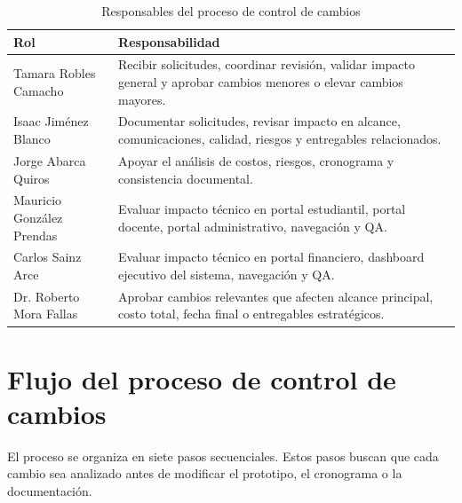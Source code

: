 \documentclass[11pt,spanish]{article}
\begin{document}
\begin{table}[H]
\centering
\caption{Responsables del proceso de control de cambios}
\label{tab:responsables-cambios}
{\small
\begin{tabularx}{\textwidth}{p{4cm} Y}
\toprule
\textbf{Rol} & \textbf{Responsabilidad} \\
\midrule
Tamara Robles Camacho & Recibir solicitudes, coordinar revisión, validar impacto general y aprobar cambios menores o elevar cambios mayores. \\
Isaac Jiménez Blanco & Documentar solicitudes, revisar impacto en alcance, comunicaciones, calidad, riesgos y entregables relacionados. \\
Jorge Abarca Quiros & Apoyar el análisis de costos, riesgos, cronograma y consistencia documental. \\
Mauricio González Prendas & Evaluar impacto técnico en portal estudiantil, portal docente, portal administrativo, navegación y QA. \\
Carlos Sainz Arce & Evaluar impacto técnico en portal financiero, dashboard ejecutivo del sistema, navegación y QA. \\
Dr. Roberto Mora Fallas & Aprobar cambios relevantes que afecten alcance principal, costo total, fecha final o entregables estratégicos. \\
\bottomrule
\end{tabularx}
}
\end{table}

\section{Flujo del proceso de control de cambios}

El proceso se organiza en siete pasos secuenciales. Estos pasos buscan que cada cambio sea analizado antes de modificar el prototipo, el cronograma o la documentación.
\end{document}
